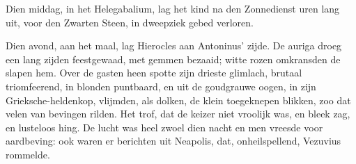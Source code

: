 \documentclass[a4paper, 12pt, oneside, dutch]{article}
\begin{document}
Dien middag, in het Helegabalium, lag het kind na den Zonnedienst uren lang uit, voor den Zwarten Steen, in dweepziek gebed verloren.

Dien avond, aan het maal, lag Hierocles aan Antoninus' zijde. De auriga droeg een lang zijden feestgewaad, met gemmen bezaaid; witte rozen omkransden de slapen hem. Over de gasten heen spotte zijn drieste glimlach, brutaal triomfeerend, in blonden puntbaard, en uit de goudgrauwe oogen, in zijn Grieksche-heldenkop, vlijmden, als dolken, de klein toegeknepen blikken, zoo dat velen van bevingen rilden. Het trof, dat de keizer niet vroolijk was, en bleek zag, en lusteloos hing. De lucht was heel zwoel dien nacht en men vreesde voor aardbeving: ook waren er berichten uit Neapolis, dat, onheilspellend, Vezuvius rommelde.

\subsection{}
\end{document}
